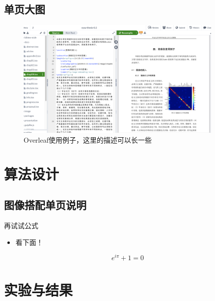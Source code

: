 \documentclass[
    fontset=fandol,
    xcolor=svgnames %
]{ctexbeamer}
\begin{document}
\subsection{单页大图}

\begin{frame}

    \begin{figure}
        \includegraphics[width=0.9\textwidth]{../image/chap03/overleaf-example.jpg}
        \caption{Overleaf使用例子，这里的描述可以长一些}
        \label{fig:overleaf-example}
    \end{figure}

\end{frame}

\section{算法设计}

\subsection{图像搭配单页说明}

\begin{frame}

    \begin{block}{再试试公式}
        \begin{itemize}
            \item 看下面！
        \end{itemize}
    \end{block}

    \begin{equation}
        e^{i\pi}+1=0
    \end{equation}

\end{frame}

\section{实验与结果}
\end{document}
